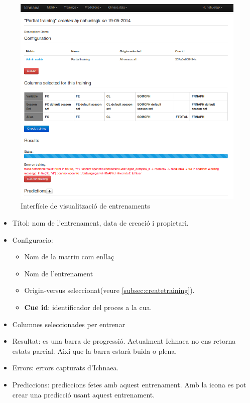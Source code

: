 \begin{figure}[h!]
  \centering
  \includegraphics[scale=0.5]{img/userguide/view_training_pending.png}
  \caption{Interfície de visualització de entrenaments}
  \label{fig:viewTraining}
\end{figure}
\begin{itemize}
\item Títol: nom de l'entrenament, data de creació i propietari.
\item Configuracio: 
\begin{itemize}
\item Nom de la matriu com enllaç
\item Nom de l'entrenament
\item Origin-versus seleccionat(veure \ref{subsec:createtraining}).
\item \textbf{Cue id}: identificador del proces a la cua.
\end{itemize}
\item Columnes seleccionades per entrenar
\item Resultat: es una barra de progressió. Actualment Ichnaea no ens retorna estats parcial. Així que la barra estarà buida o plena.
\item Errors: errors capturats d'Ichnaea.
\item Prediccions: prediccions fetes amb aquest entrenament. Amb la icona \iconadd es pot crear una predicció usant aquest entrenament.
\end{itemize}

